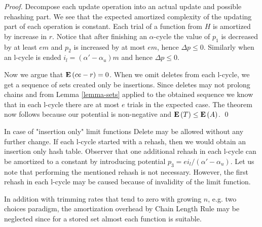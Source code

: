 \begin{proof}
Decompose each update operation into an actual update and possible rehashing part. We see that the expected amortized complexity of the updating part of each operation is constant. Each trial of a function from $H$ is amortized by increase in $r$. Notice that after finishing an $\alpha$-cycle the value of $p_1$ is decreased by at least $em$ and $p_2$ is increased by at most $em$, hence $\Delta p \leq 0$. Similarly when an l-cycle is ended $i_l = (\alpha' - \alpha_u)m$ and hence $\Delta p \leq 0$. 

Now we argue that $\mathbf{E}\left(ce - r\right) = 0$. When we omit deletes from each l-cycle, we get a sequence of sets created only be insertions. Since deletes may not prolong chains and from Lemma \ref{lemma-sets} applied to the obtained sequence we know that in each l-cycle there are at most $e$ trials in the expected case. The theorem now follows because our potential is non-negative and $\mathbf{E}\left(T\right) \leq \mathbf{E}\left(A\right)$.
\qed
\end{proof}

In case of "insertion only" limit functions Delete may be allowed without any further change. If each l-cycle started with a rehash, then we would obtain an insertion only hash table. Observer that one additional rehash in each l-cycle can be amortized to a constant by introducing potential $p_3 = {ei_{l}}/{(\alpha' - \alpha_u)}$. Let us note that performing the mentioned rehash is not necessary. However, the first rehash in each l-cycle may be caused because of invalidity of the limit function.

In addition with trimming rates that tend to zero with growing $n$, e.g. two choices paradigm, the amortization overhead by Chain Length Rule may be neglected since for a stored set almost each function is suitable.
